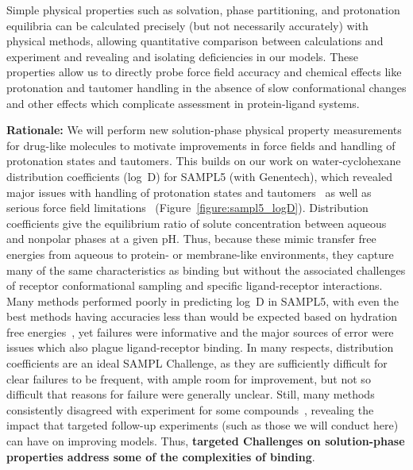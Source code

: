 \documentclass[11pt]{article}
\begin{document}
Simple physical properties such as solvation, phase partitioning, and protonation equilibria can be calculated precisely (but not necessarily accurately) with physical methods, allowing quantitative comparison between calculations and experiment and revealing and isolating deficiencies in our models. 
These properties allow us to directly probe force field accuracy and chemical effects like protonation and tautomer handling in the absence of slow conformational changes and other effects which complicate assessment in protein-ligand systems. 


{\bf Rationale:}
We will perform new solution-phase physical property measurements for drug-like molecules to motivate improvements in force fields and handling of protonation states and tautomers.
This builds on our work on water-cyclohexane distribution coefficients (log~D) for SAMPL5 (with Genentech), which revealed major issues with handling of protonation states and tautomers~\cite{Bannan:2016:JComputAidedMolDes} as well as serious force field limitations~\cite{paranahewage_predicting_2016} (Figure~\ref{figure:sampl5_logD}).
Distribution coefficients give the equilibrium ratio of solute concentration between aqueous and nonpolar phases at a given pH.
Thus, because these mimic transfer free energies from aqueous to protein- or membrane-like environments, they capture many of the same characteristics as binding but without the associated challenges of receptor conformational sampling and specific ligand-receptor interactions.
Many methods performed poorly in predicting log~D in SAMPL5, with even the best methods having accuracies less than would be expected based on hydration free energies~\cite{Bannan:2016:JComputAidedMolDes}, yet failures were informative and the major sources of error were issues which also plague ligand-receptor binding.
In many respects, distribution coefficients are an ideal SAMPL Challenge, as they are sufficiently difficult for clear failures to be frequent, with ample room for improvement, but not so difficult that reasons for failure were generally unclear. 
Still, many methods consistently disagreed with experiment for some compounds~\cite{paranahewage_predicting_2016, klamt_prediction_2016, Bannan:2016:JComputAidedMolDes, rustenburg_measuring_2016}, revealing the impact that targeted follow-up experiments (such as those we will conduct here) can have on improving models.
Thus, \textbf{targeted Challenges on solution-phase properties address some of the complexities of binding}.  
\end{document}
